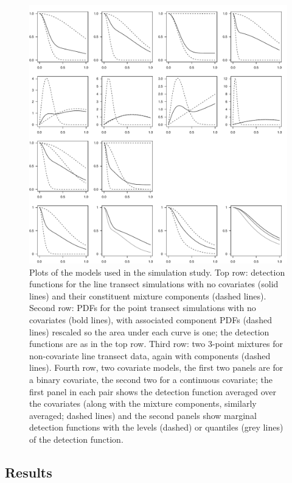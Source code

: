 \begin{figure}
\centering
\includegraphics[width=\textwidth]{mix/figs/sim-detfct.pdf}
\caption{Plots of the models used in the simulation study. Top row: detection functions for the line transect simulations with no covariates (solid lines) and their constituent mixture components (dashed lines). Second row: PDFs for the point transect simulations with no covariates (bold lines), with associated component PDFs (dashed lines) rescaled so the area under each curve is one; the detection functions are as in the top row. Third row: two 3-point mixtures for non-covariate line transect data, again with components (dashed lines). Fourth row, two covariate models, the first two panels are for a binary covariate, the second two for a continuous covariate; the first panel in each pair shows the detection function averaged over the covariates (along with the mixture components, similarly averaged; dashed lines) and the second panels show marginal detection functions with the levels (dashed) or quantiles (grey lines) of the detection function.}
\label{sim-detfcts}
\end{figure}

\subsection{Results}

